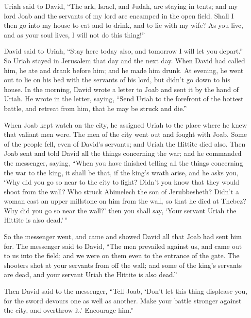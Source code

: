  Uriah said to David, ``The ark, Israel, and Judah, are
staying in tents; and my lord Joab and the servants of my lord are
encamped in the open field. Shall I then go into my house to eat and to
drink, and to lie with my wife? As you live, and as your soul lives, I
will not do this thing!''

 David said to Uriah, ``Stay here today also, and tomorrow
I will let you depart.'' So Uriah stayed in Jerusalem that day and the
next day.  When David had called him, he ate and drank
before him; and he made him drunk. At evening, he went out to lie on his
bed with the servants of his lord, but didn't go down to his house.
 In the morning, David wrote a letter to Joab and sent it
by the hand of Uriah.  He wrote in the letter, saying,
``Send Uriah to the forefront of the hottest battle, and retreat from
him, that he may be struck and die.''

 When Joab kept watch on the city, he assigned Uriah to the
place where he knew that valiant men were.  The men of the
city went out and fought with Joab. Some of the people fell, even of
David's servants; and Uriah the Hittite died also.  Then
Joab sent and told David all the things concerning the war;
 and he commanded the messenger, saying, ``When you have
finished telling all the things concerning the war to the king,
 it shall be that, if the king's wrath arise, and he asks
you, `Why did you go so near to the city to fight? Didn't you know that
they would shoot from the wall?  Who struck Abimelech the
son of Jerubbesheth? Didn't a woman cast an upper millstone on him from
the wall, so that he died at Thebez? Why did you go so near the wall?'
then you shall say, `Your servant Uriah the Hittite is also dead.'\,''

 So the messenger went, and came and showed David all that
Joab had sent him for.  The messenger said to David, ``The
men prevailed against us, and came out to us into the field; and we were
on them even to the entrance of the gate.  The shooters
shot at your servants from off the wall; and some of the king's servants
are dead, and your servant Uriah the Hittite is also dead.''

 Then David said to the messenger, ``Tell Joab, `Don't let
this thing displease you, for the sword devours one as well as another.
Make your battle stronger against the city, and overthrow it.' Encourage
him.''

